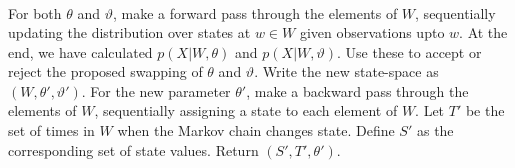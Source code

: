 \begin{algorithm}[H]
\begin{algorithmic}[1]
\begin{align*}
        \end{align*}
    \State For both $\theta$ and $\vartheta$, make a forward pass through the 
    elements of $W$, sequentially updating the distribution over states at 
    $w \in W$ given observations upto $w$. At the end, we have calculated
    $p(X|W,\theta)$ and $p(X|W,\vartheta)$. Use these to accept or reject the
    proposed swapping of $\theta$ and $\vartheta$. Write the new state-space
    as $(W,\theta',\vartheta')$.
    \State For the new parameter $\theta'$, make a backward pass through 
    the elements of
    $W$, sequentially assigning a state to each element of $W$.
    \State Let $T'$ be the set of times in $W$ when the Markov chain changes state. Define $S'$ as the corresponding set of state values. Return $(S', T', \theta')$.
\end{algorithmic}
\end{algorithm}

